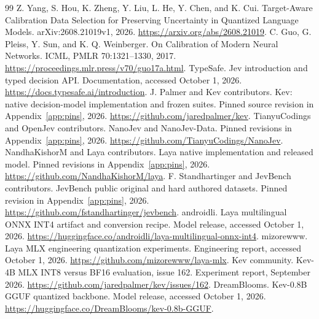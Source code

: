 \documentclass[10pt,twocolumn]{article}
\begin{document}
\begin{thebibliography}{99}
Z. Yang, S. Hou, K. Zheng, Y. Liu, L. He, Y. Chen, and K. Cui.
\newblock Target-Aware Calibration Data Selection for Preserving Uncertainty in Quantized Language Models.
\newblock arXiv:2608.21019v1, 2026. \url{https://arxiv.org/abs/2608.21019}.
C. Guo, G. Pleiss, Y. Sun, and K. Q. Weinberger.
\newblock On Calibration of Modern Neural Networks.
\newblock ICML, PMLR 70:1321--1330, 2017.
\newblock \url{https://proceedings.mlr.press/v70/guo17a.html}.
TypeSafe. \newblock Jev introduction and typed decision API.
\newblock Documentation, accessed October 1, 2026.
\newblock \url{https://docs.typesafe.ai/introduction}.
J. Palmer and Kev contributors.
\newblock Kev: native decision-model implementation and frozen suites.
\newblock Pinned source revision in Appendix~\ref{app:pins}, 2026.
\newblock \url{https://github.com/jaredpalmer/kev}.
TianyuCodings and OpenJev contributors.
\newblock NanoJev and NanoJev-Data.
\newblock Pinned revisions in Appendix~\ref{app:pins}, 2026.
\newblock \url{https://github.com/TianyuCodings/NanoJev}.
NandhaKishorM and Laya contributors.
\newblock Laya native implementation and released model.
\newblock Pinned revisions in Appendix~\ref{app:pins}, 2026.
\newblock \url{https://github.com/NandhaKishorM/laya}.
F. Standhartinger and JevBench contributors.
\newblock JevBench public original and hard authored datasets.
\newblock Pinned revision in Appendix~\ref{app:pins}, 2026.
\newblock \url{https://github.com/fstandhartinger/jevbench}.
androidli. \newblock Laya multilingual ONNX INT4 artifact and conversion recipe.
\newblock Model release, accessed October 1, 2026.
\newblock \url{https://huggingface.co/androidli/laya-multilingual-onnx-int4}.
mizorewww. \newblock Laya MLX engineering quantization experiments.
\newblock Engineering report, accessed October 1, 2026.
\newblock \url{https://github.com/mizorewww/laya-mlx}.
Kev community. \newblock Kev-4B MLX INT8 versus BF16 evaluation, issue 162.
\newblock Experiment report, September 2026.
\newblock \url{https://github.com/jaredpalmer/kev/issues/162}.
DreamBlooms. \newblock Kev-0.8B GGUF quantized backbone.
\newblock Model release, accessed October 1, 2026.
\newblock \url{https://huggingface.co/DreamBlooms/kev-0.8b-GGUF}.
\end{thebibliography}
\end{document}
